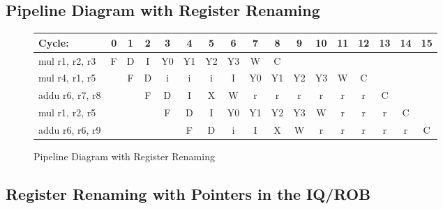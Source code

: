 \documentclass[10pt]{article}
\begin{document}
\subsection{Pipeline Diagram with Register Renaming}

\begin{figure}[H]
\centering
{\setlength{\tabcolsep}{2pt}
\begin{tabular}{|l|c|c|c|c|c|c|c|c|c|c|c|c|c|c|c|c|}
\hline
Cycle:            & 0 & 1 & 2 & 3 & 4 & 5 & 6 & 7 & 8 & 9 & 10 & 11 & 12 & 13 & 14 & 15 \\ \hline
mul  r1, r2, r3   & F & D & I & Y0& Y1& Y2& Y3& W & C &   &    &    &    &    &    &    \\ \hline
mul  r4, r1, r5   &   & F & D & i & i & i & I & Y0& Y1& Y2& Y3 & W  & C  &    &    &    \\ \hline
addu r6, r7, r8   &   &   & F & D & I & X & W & r & r & r & r  & r  & r  & C  &    &    \\ \hline
mul  r1, r2, r5   &   &   &   & F & D & I & Y0& Y1& Y2& Y3& W  & r  & r  & r  & C  &    \\ \hline
addu r6, r6, r9   &   &   &   &   & F & D & i & I & X & W & r  & r  & r  & r  & r  & C  \\ \hline
\end{tabular}
}
\caption{Pipeline Diagram with Register Renaming}
\end{figure}

\subsection{Register Renaming with Pointers in the IQ/ROB}
\end{document}
